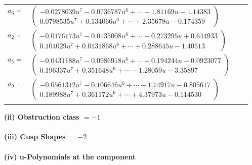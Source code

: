\documentclass[1p]{elsarticle_modified}
\theoremstyle{definition}
\begin{document}
\begin{tabular}{m{7pt} m{180pt} m{7pt} m{180pt} }
\flushright $a_{6}=$&$\begin{pmatrix}-0.0278039 u^{7}-0.0736787 u^{6}+\cdots-1.81169 u-1.14383\\0.0798535 u^{7}+0.134066 u^{6}+\cdots+2.35678 u-0.174359\end{pmatrix}$ \\
\flushright $a_{2}=$&$\begin{pmatrix}-0.0176173 u^{7}-0.0135008 u^{6}+\cdots-0.273295 u+0.644933\\0.104029 u^{7}+0.0131868 u^{6}+\cdots+0.288645 u-1.40513\end{pmatrix}$ \\
\flushright $a_{5}=$&$\begin{pmatrix}-0.0431188 u^{7}-0.0986918 u^{6}+\cdots+0.194244 u-0.0923077\\0.196337 u^{7}+0.351648 u^{6}+\cdots-1.28059 u-3.35897\end{pmatrix}$ \\
\flushright $a_{9}=$&$\begin{pmatrix}-0.0561312 u^{7}-0.106646 u^{6}+\cdots-1.74917 u-0.805617\\0.189988 u^{7}+0.361172 u^{6}+\cdots+4.37973 u-0.114530\end{pmatrix}$\\&\end{tabular}
\flushleft \textbf{(ii) Obstruction class $= -1$}\\~\\
\flushleft \textbf{(iii) Cusp Shapes $= -2$}\\~\\
\newpage\renewcommand{\arraystretch}{1}
\flushleft \textbf{(iv) u-Polynomials at the component}\newline \\
\end{document}
